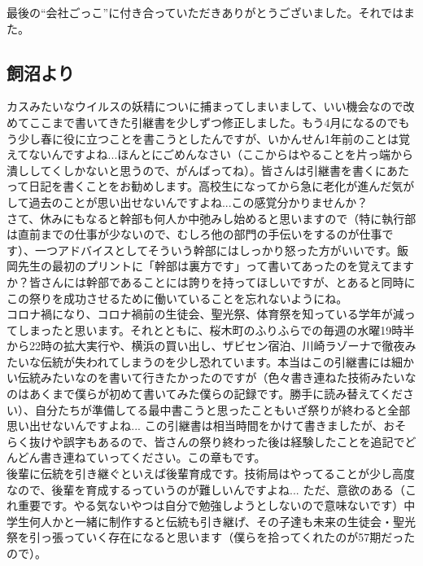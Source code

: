 \documentclass[a4paper]{ltjsreport}
\begin{document}
最後の``会社ごっこ''に付き合っていただきありがとうございました。それではまた。

\subsection{飼沼より}
カスみたいなウイルスの妖精についに捕まってしまいまして、いい機会なので改めてここまで書いてきた引継書を少しずつ修正しました。もう4月になるのでもう少し春に役に立つことを書こうとしたんですが、いかんせん1年前のことは覚えてないんですよね...ほんとにごめんなさい（ここからはやることを片っ端から潰ししてくしかないと思うので、がんばってね）。皆さんは引継書を書くにあたって日記を書くことをお勧めします。高校生になってから急に老化が進んだ気がして過去のことが思い出せないんですよね...この感覚分かりませんか？
\\

さて、休みにもなると幹部も何人か中弛みし始めると思いますので（特に執行部は直前までの仕事が少ないので、むしろ他の部門の手伝いをするのが仕事です）、一つアドバイスとしてそういう幹部にはしっかり怒った方がいいです。飯岡先生の最初のプリントに「幹部は裏方です」って書いてあったのを覚えてますか？皆さんには幹部であることには誇りを持ってほしいですが、とあると同時にこの祭りを成功させるために働いていることを忘れないようにね。
\\

コロナ禍になり、コロナ禍前の生徒会、聖光祭、体育祭を知っている学年が減ってしまったと思います。それとともに、桜木町のふりふらでの毎週の水曜19時半から22時の拡大実行や、横浜の買い出し、ザビセン宿泊、川崎ラゾーナで徹夜みたいな伝統が失われてしまうのを少し恐れています。本当はこの引継書には細かい伝統みたいなのを書いて行きたかったのですが（色々書き連ねた技術みたいなのはあくまで僕らが初めて書いてみた僕らの記録です。勝手に読み替えてください）、自分たちが準備してる最中書こうと思ったこともいざ祭りが終わると全部思い出せないんですよね... この引継書は相当時間をかけて書きましたが、おそらく抜けや誤字もあるので、皆さんの祭り終わった後は経験したことを追記でどんどん書き連ねていってください。この章もです。
\\

後輩に伝統を引き継ぐといえば後輩育成です。技術局はやってることが少し高度なので、後輩を育成するっていうのが難しいんですよね... ただ、意欲のある（これ重要です。やる気ないやつは自分で勉強しようとしないので意味ないです）中学生何人かと一緒に制作すると伝統も引き継げ、その子達も未来の生徒会・聖光祭を引っ張っていく存在になると思います（僕らを拾ってくれたのが57期だったので）。
\\
\end{document}

